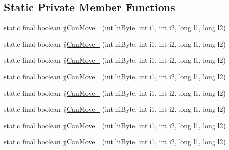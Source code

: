 \subsection*{Static Private Member Functions}
\begin{DoxyCompactItemize}
\item 
static final boolean \hyperlink{classuk_1_1ac_1_1manchester_1_1cs_1_1owlapi_1_1dlsyntax_1_1parser_1_1_d_l_syntax_parser_token_manager_a59e30210817274a5a7f4609f2be894be}{jj\-Can\-Move\-\_} (int hi\-Byte, int i1, int i2, long l1, long l2)
\item 
static final boolean \hyperlink{classuk_1_1ac_1_1manchester_1_1cs_1_1owlapi_1_1dlsyntax_1_1parser_1_1_d_l_syntax_parser_token_manager_a50c6f62b5a13c6fe3fdffc73bba9b256}{jj\-Can\-Move\-\_} (int hi\-Byte, int i1, int i2, long l1, long l2)
\item 
static final boolean \hyperlink{classuk_1_1ac_1_1manchester_1_1cs_1_1owlapi_1_1dlsyntax_1_1parser_1_1_d_l_syntax_parser_token_manager_afba67feff862ff4e76cf909ff546e83d}{jj\-Can\-Move\-\_} (int hi\-Byte, int i1, int i2, long l1, long l2)
\item 
static final boolean \hyperlink{classuk_1_1ac_1_1manchester_1_1cs_1_1owlapi_1_1dlsyntax_1_1parser_1_1_d_l_syntax_parser_token_manager_ae893ab64d6ac40862e5cd87b3146bb0e}{jj\-Can\-Move\-\_} (int hi\-Byte, int i1, int i2, long l1, long l2)
\item 
static final boolean \hyperlink{classuk_1_1ac_1_1manchester_1_1cs_1_1owlapi_1_1dlsyntax_1_1parser_1_1_d_l_syntax_parser_token_manager_a166eb4bd798f533db452618d5b068423}{jj\-Can\-Move\-\_} (int hi\-Byte, int i1, int i2, long l1, long l2)
\item 
static final boolean \hyperlink{classuk_1_1ac_1_1manchester_1_1cs_1_1owlapi_1_1dlsyntax_1_1parser_1_1_d_l_syntax_parser_token_manager_a0b584795ebefc3de54c4452058cca416}{jj\-Can\-Move\-\_} (int hi\-Byte, int i1, int i2, long l1, long l2)
\item 
static final boolean \hyperlink{classuk_1_1ac_1_1manchester_1_1cs_1_1owlapi_1_1dlsyntax_1_1parser_1_1_d_l_syntax_parser_token_manager_a6b9d04e29a65f6799372d737cc404ad1}{jj\-Can\-Move\-\_} (int hi\-Byte, int i1, int i2, long l1, long l2)
\item 
static final boolean \hyperlink{classuk_1_1ac_1_1manchester_1_1cs_1_1owlapi_1_1dlsyntax_1_1parser_1_1_d_l_syntax_parser_token_manager_aeab380ef853a83900c5c0dcf52832668}{jj\-Can\-Move\-\_} (int hi\-Byte, int i1, int i2, long l1, long l2)
\item 

\end{DoxyCompactItemize}
